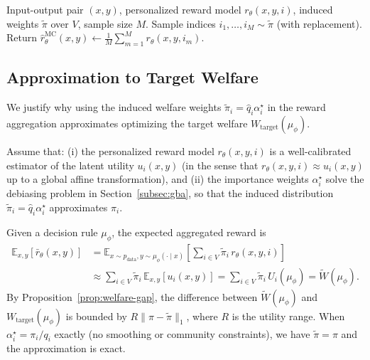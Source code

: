 \documentclass{article}
\theoremstyle{plain}
\theoremstyle{definition}
\theoremstyle{remark}
\begin{document}
\begin{algorithm}[h]
\caption{Optional: Monte Carlo aggregation for $\bar r_\theta(x,y)$}
\label{alg:mc-aggregation}
\begin{algorithmic}[1]
\REQUIRE Input-output pair $(x,y)$, personalized reward model $r_\theta(x,y,i)$, induced weights $\tilde\pi$ over $V$, sample size $M$.
\STATE Sample indices $i_1,\dots,i_M \sim \tilde\pi$ (with replacement).
\STATE Return $\widehat{r}_{\theta}^{\mathrm{MC}}(x,y)\leftarrow \frac{1}{M}\sum_{m=1}^M r_\theta(x,y,i_m)$.
\end{algorithmic}
\end{algorithm}

\subsection{Approximation to Target Welfare}
\label{app:welfare-approx}

We justify why using the induced welfare weights $\tilde\pi_i = \hat q_i \alpha_i^\star$
in the reward aggregation approximates optimizing the target welfare
$W_{\text{target}}(\mu_\phi)$.

Assume that:
(i) the personalized reward model $r_\theta(x,y,i)$ is a well-calibrated
estimator of the latent utility $u_i(x,y)$ (in the sense that
$r_\theta(x,y,i) \approx u_i(x,y)$ up to a global affine transformation),
and (ii) the importance weights $\alpha_i^\star$ solve the debiasing problem in
Section~\ref{subsec:gba}, so that the induced distribution
$\tilde\pi_i = \hat q_i \alpha_i^\star$ approximates $\pi_i$.

Given a decision rule $\mu_\phi$, the expected aggregated reward is
\begin{align}
    \mathbb{E}_{x,y}\!\left[ \bar r_\theta(x,y) \right]
    &= \mathbb{E}_{x \sim p_{\text{data}}, y \sim \mu_\phi(\cdot \mid x)}
    \left[ \sum_{i \in V} \tilde\pi_i \, r_\theta(x,y,i) \right] \nonumber
    \\
    &\approx
    \sum_{i \in V} \tilde\pi_i \,
    \mathbb{E}_{x,y} \left[ u_i(x,y) \right]
    =
    \sum_{i \in V} \tilde\pi_i \, U_i(\mu_\phi)
    =
    \widetilde{W}(\mu_\phi).
\end{align}
By Proposition~\ref{prop:welfare-gap}, the difference between
$\widetilde{W}(\mu_\phi)$ and $W_{\text{target}}(\mu_\phi)$ is bounded by
$R \|\pi - \tilde\pi\|_1$, where $R$ is the utility range. When
$\alpha_i^\star = \pi_i / q_i$ exactly (no smoothing or community constraints),
we have $\tilde\pi = \pi$ and the approximation is exact.
\end{document}
